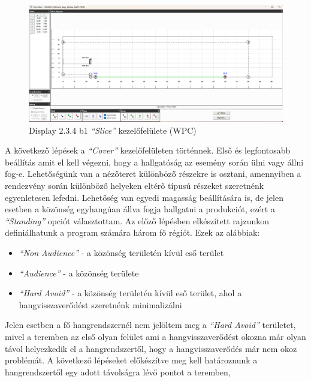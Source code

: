 \begin{figure}[H]
	\centering
	\includegraphics[width=\textwidth, keepaspectratio]{figures/display_wpc_1.png}
	\caption{Display 2.3.4 b1 \textit{``Slice''} kezelőfelülete (WPC)}\label{fig:display_wpc_1}
\end{figure}
A következő lépések a \textit{``Cover''} kezelőfelületen történnek.
Első és legfontosabb beállítás amit el kell végezni, hogy a hallgatóság az esemény során ülni vagy állni fog-e.
Lehetőségünk van a nézőteret különböző részekre is osztani, amennyiben a rendezvény során különböző helyeken
eltérő típusú részeket szeretnénk egyenletesen lefedni. Lehetőség van egyedi magasság beállítására is,
de jelen esetben a közönség egyhangúan állva fogja hallgatni a produkciót, ezért a \textit{``Standing''} opciót választottam.
Az előző lépésben elkészített rajzunkon definiálhatunk a program számára három fő régiót.
\newline Ezek az alábbiak:
\begin{itemize}
	\item \textit{``Non Audience''} - a közönség területén kívül eső terület
	\item \textit{``Audience''} - a közönség területe
	\item \textit{``Hard Avoid''} - a közönség területén kívül eső terület, ahol a hangvisszaverődést szeretnénk minimalizálni
\end{itemize}
Jelen esetben a fő hangrendszernél nem jelöltem meg a \textit{``Hard Avoid''} területet, mivel a teremben az első olyan felület
ami a hangvisszaverődést okozna már olyan távol helyezkedik el a hangrendszertől, hogy a hangvisszaverődés már nem okoz problémát.
A következő lépéseket előkészítve meg kell határoznunk a hangrendszertől egy adott távolságra lévő pontot a teremben,
